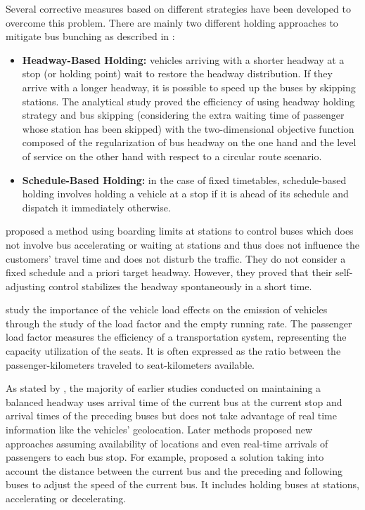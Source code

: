 \documentclass[12pt,a4paper]{article}
\begin{document}
Several corrective measures based on different strategies have been developed to overcome this problem. There are mainly two different holding approaches to mitigate bus bunching as described in \cite{reliability}:

\begin{itemize}
\item \textbf{Headway-Based Holding:} vehicles arriving with a shorter headway at a stop (or holding point) wait to restore the headway distribution. If they arrive with a longer headway, it is possible to speed up the buses by skipping stations. The analytical study \cite{hybrid} proved the efficiency of using headway holding strategy and bus skipping (considering the extra waiting time of passenger whose station has been skipped) with the two-dimensional objective function composed of the regularization of bus headway on the one hand and the level of service on the other hand with respect to a circular route scenario. 
\item \textbf{Schedule-Based Holding:} in the case of fixed timetables, schedule-based holding involves holding a vehicle at a stop if it is ahead of its schedule and dispatch it immediately otherwise.
\end{itemize}
  
\cite{selfadjusting} proposed a method using boarding limits at stations to control buses which does not involve bus accelerating or waiting at stations and thus does not influence the customers' travel time and does not disturb the traffic. They do not consider a fixed schedule and a priori target headway. However, they proved that their self-adjusting control stabilizes the headway spontaneously in a short time. 

\cite{loadFactor} study the importance of the vehicle load effects on the emission of vehicles through the study of the load factor and the empty running rate. The passenger load factor measures the efficiency of a transportation system, representing the capacity utilization of the seats. It is often expressed as the ratio between the passenger-kilometers traveled to seat-kilometers available. 

As stated by \cite{information}, the majority of earlier studies conducted on maintaining a balanced headway uses arrival time of the current bus at the current stop and arrival times of the preceding buses but does not take advantage of real time information like the vehicles' geolocation. Later methods proposed new approaches assuming availability of locations and even real-time arrivals of passengers to each bus stop. For example, \cite{cooperation} proposed a solution taking into account the distance between the current bus and the preceding and following buses to adjust the speed of the current bus. It includes holding buses at stations, accelerating or decelerating. 
\end{document}
